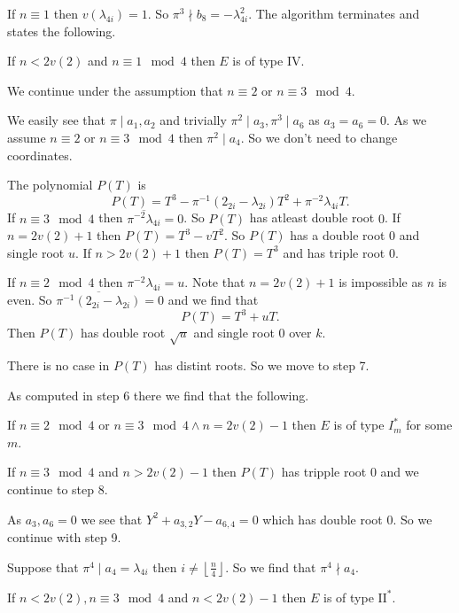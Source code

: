 If $n \equiv 1$ then $v(\lambda_{4i}) = 1$. So $\pi^3 \nmid b_8 = - \lambda_{4i}^2$. 
The algorithm terminates and states the following. 
\begin{tateconclusion}
	If $n < 2v(2)$ and $n \equiv 1 \mod 4$ then $E$ is of type  $\mathrm {IV}$. 
\end{tateconclusion}
We continue under the assumption that $n \equiv 2$ or $n \equiv 3 \mod 4$. 

We easily see that $\pi \mid a_1, a_2$ and trivially $\pi^2 \mid a_3, \pi^3 \mid a_6$ as $a_3 = a_6 = 0$. 
As we assume $n \equiv 2$ or $n \equiv 3 \mod 4$ then $\pi^2 \mid a_4$. 
So we don't need to change coordinates. 

The polynomial $P(T)$ is \[
	P(T) = T^3  -\pi^{-1}(2_{2i} - \lambda_{2i})T^2 + \pi^{-2}\lambda_{4i} T
.\] 
If $n \equiv 3 \mod 4$ then $\overline{\pi^{-2} \lambda_{4i}} = 0$. 
So $P(T)$ has atleast double root $0$.
If $n = 2v(2) + 1$ then  $P(T) = T^3 - vT^2$. So $P(T)$ has a double root $0$ and single root $u$. 
If $n > 2v(2) + 1$ then $P(T) = T^3$ and has triple root $0$. 

If $n \equiv 2 \mod 4$ then $\pi^{-2} \lambda_{4i} = u$. 
Note that $n = 2v(2) +1 $ is impossible as $n$ is even. So $\overline{\pi^{-1} (2_{2i} - \lambda_{2i})} = 0$ and we find that \[
	P(T) = T^3 + u T
.\] 
Then $P(T)$ has double root $\sqrt{u} $ and single root $0$ over $k$.

There is no case in $P(T)$ has distint roots. So we move to step 7.

As computed in step 6 there we find that the following. 
\begin{tateconclusion}
	If $n \equiv 2 \mod 4$ or $n \equiv 3 \mod 4 \wedge n = 2v(2) - 1$ then $E$ is of type $I_m^*$ for some $m$. 
\end{tateconclusion}
If  $n \equiv 3 \mod 4$ and $n > 2v(2) - 1$ then $P(T)$ has tripple root $0$ and we continue to step 8.

As $a_3, a_6 = 0$ we see that $Y^2 + a_{3,2} Y - a_{6, 4} = 0$ which has double root $0$. 
So we continue with step 9. 

Suppose that $ \pi^{4} \mid a_4 = \lambda_{4i}$ then $i \ne \left\lfloor \frac{n}{4} \right\rfloor$.
So we find that $\pi^{4} \nmid a_4$. 
\begin{tateconclusion}
	If $n < 2v(2), n\equiv 3 \mod 4$ and $n < 2v(2) - 1$ then $E$ is of type $\mathrm{II}^*$. 
\end{tateconclusion}

